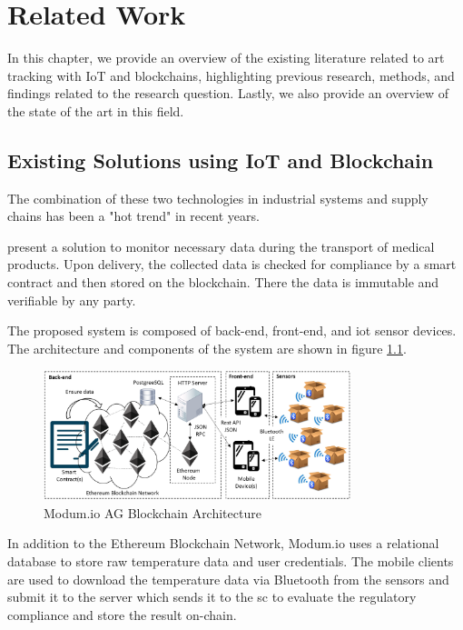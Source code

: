 \chapter{Related Work}
In this chapter, we provide an overview of the existing literature related to art tracking with IoT and blockchains, highlighting previous research, methods, and findings related to the research question. Lastly, we also provide an overview of the state of the art in this field.

\section{Existing Solutions using IoT and Blockchain}
The combination of these two technologies in industrial systems and supply chains has been a "hot trend" in recent years. \cite{industryiot} 

\textcite{modum.io} present a solution to monitor necessary data during the transport of medical products. Upon delivery, the collected data is checked for compliance by a smart contract and then stored on the blockchain. There the data is immutable and verifiable by any party.

The proposed system is composed of back-end, front-end, and \gls{iot} sensor devices. The architecture and components of the system are shown in figure \ref{fig:modum.io}.

\begin{figure}[ht]
    \centering
    \includegraphics[width=0.8\textwidth]{diagrams/modum_architecutre.png}
    \caption{Modum.io AG Blockchain Architecture \cite{modum.io}}
    \label{fig:modum.io}
\end{figure}

In addition to the Ethereum Blockchain Network, Modum.io uses a relational database to store raw temperature data and user credentials. The mobile clients are used to download the temperature data via Bluetooth from the sensors and submit it to the server which sends it to the \gls{sc} to evaluate the regulatory compliance and store the result \gls{on-chain}.

